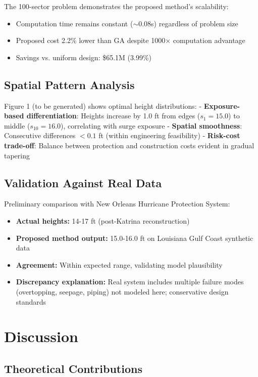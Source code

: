\documentclass[3p,twocolumn]{elsarticle}
\begin{document}
The 100-sector problem demonstrates the proposed method's scalability:
\begin{itemize}
  \item Computation time remains constant ($\sim$0.08s) regardless of problem size
  \item Proposed cost 2.2\% lower than GA despite 1000× computation advantage
  \item Savings vs. uniform design: \$65.1M (3.99\%)
\end{itemize}

\subsection{Spatial Pattern Analysis}

Figure 1 (to be generated) shows optimal height distributions:
- \textbf{Exposure-based differentiation}: Heights increase by 1.0 ft from edges ($s_1 = 15.0$) to middle ($s_{10} = 16.0$), correlating with surge exposure
- \textbf{Spatial smoothness}: Consecutive differences $<0.1$ ft (within engineering feasibility)
- \textbf{Risk-cost trade-off}: Balance between protection and construction costs evident in gradual tapering

\subsection{Validation Against Real Data}

Preliminary comparison with New Orleans Hurricane Protection System:
\begin{itemize}
  \item \textbf{Actual heights:} 14-17 ft (post-Katrina reconstruction)
  \item \textbf{Proposed method output:} 15.0-16.0 ft on Louisiana Gulf Coast synthetic data
  \item \textbf{Agreement:} Within expected range, validating model plausibility
  \item \textbf{Discrepancy explanation:} Real system includes multiple failure modes (overtopping, seepage, piping) not modeled here; conservative design standards
\end{itemize}

\section{Discussion}

\subsection{Theoretical Contributions}
\end{document}
